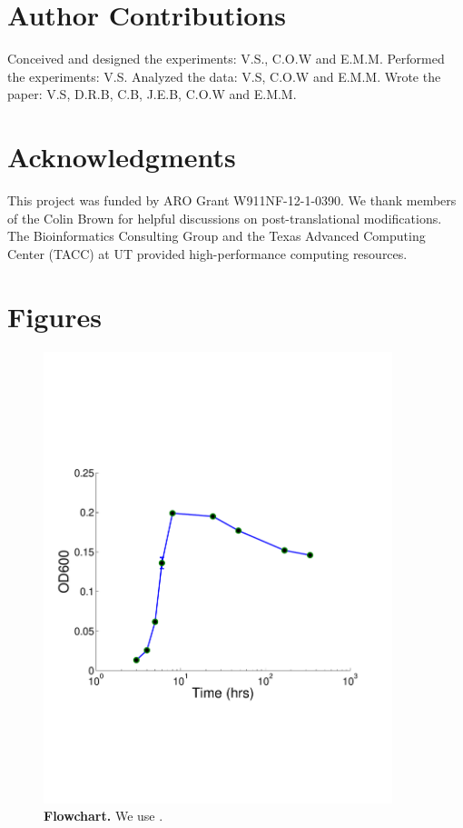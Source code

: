 \documentclass[12pt]{article}
\begin{document}
\section{Author Contributions}
Conceived and designed the experiments: V.S., C.O.W and E.M.M. Performed the experiments: V.S. Analyzed the data: V.S, C.O.W and E.M.M. Wrote the paper: V.S, D.R.B, C.B, J.E.B, C.O.W and E.M.M.

\section{Acknowledgments}
This project was funded by ARO Grant W911NF-12-1-0390. We thank members of the Colin Brown for helpful discussions on post-translational modifications. The Bioinformatics Consulting Group and the Texas Advanced Computing Center (TACC) at UT provided high-performance computing resources. 




\newpage

\section*{Figures}

\begin{figure}[!ht]
\centerline{\includegraphics[width=4in]{Figures/PTM_modified.pdf}}
\caption{\label{fig:flowchart}\textbf{Flowchart.} We use .
}
\end{figure}
\end{document}
